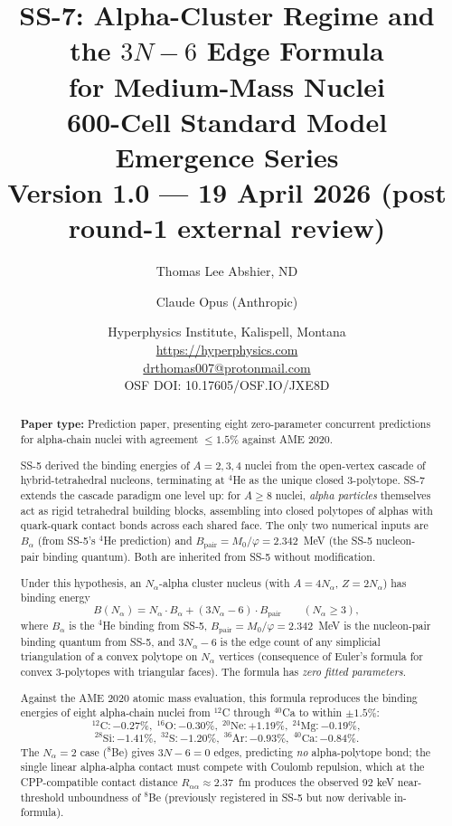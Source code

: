 \documentclass[11pt,letterpaper]{article}
\title{\textbf{SS-7: Alpha-Cluster Regime and the $3N-6$ Edge Formula\\ for Medium-Mass Nuclei}\\[6pt]
{\large 600-Cell Standard Model Emergence Series}\\[4pt]
{\normalsize Version 1.0 --- 19 April 2026 (post round-1 external review)}}
\author{Thomas Lee Abshier, ND \and Claude Opus (Anthropic)}
\date{\normalsize Hyperphysics Institute, Kalispell, Montana\\
\url{https://hyperphysics.com}\\
\href{mailto:drthomas007@protonmail.com}{drthomas007@protonmail.com}\\[4pt]
\small OSF DOI: 10.17605/OSF.IO/JXE8D}
\newcommand{\phig}{\varphi}
\newcommand{\Mzero}{M_0}
\newcommand{\Bpair}{B_{\mathrm{pair}}}
\newcommand{\Balpha}{B_{\alpha}}
\newcommand{\Nalpha}{N_{\alpha}}
\newcommand{\Raa}{R_{\alpha\alpha}}
\begin{document}
\maketitle

\begin{abstract}
\noindent\textbf{Paper type:} Prediction paper, presenting eight zero-parameter concurrent predictions for alpha-chain nuclei with agreement $\leq 1.5\%$ against AME 2020.

SS-5 derived the binding energies of $A = 2, 3, 4$ nuclei from the open-vertex cascade of hybrid-tetrahedral nucleons, terminating at ${}^4$He as the unique closed 3-polytope. SS-7 extends the cascade paradigm one level up: for $A \geq 8$ nuclei, \emph{alpha particles} themselves act as rigid tetrahedral building blocks, assembling into closed polytopes of alphas with quark-quark contact bonds across each shared face. The only two numerical inputs are $\Balpha$ (from SS-5's ${}^4$He prediction) and $\Bpair = \Mzero/\phig = 2.342$~MeV (the SS-5 nucleon-pair binding quantum). Both are inherited from SS-5 without modification.

Under this hypothesis, an $N_\alpha$-alpha cluster nucleus (with $A = 4N_\alpha$, $Z = 2N_\alpha$) has binding energy
\[
B(\Nalpha) = \Nalpha \cdot \Balpha + (3\Nalpha - 6) \cdot \Bpair \qquad (\Nalpha \geq 3),
\]
where $\Balpha$ is the $^4$He binding from SS-5, $\Bpair = \Mzero/\phig = 2.342$~MeV is the nucleon-pair binding quantum from SS-5, and $3\Nalpha - 6$ is the edge count of any simplicial triangulation of a convex polytope on $\Nalpha$ vertices (consequence of Euler's formula for convex 3-polytopes with triangular faces). The formula has \emph{zero fitted parameters}.

Against the AME 2020 atomic mass evaluation, this formula reproduces the binding energies of eight alpha-chain nuclei from ${}^{12}$C through ${}^{40}$Ca to within $\pm 1.5\%$:
\[
{}^{12}\mathrm{C}: -0.27\%, \; {}^{16}\mathrm{O}: -0.30\%, \; {}^{20}\mathrm{Ne}: +1.19\%, \; {}^{24}\mathrm{Mg}: -0.19\%,
\]
\[
{}^{28}\mathrm{Si}: -1.41\%, \; {}^{32}\mathrm{S}: -1.20\%, \; {}^{36}\mathrm{Ar}: -0.93\%, \; {}^{40}\mathrm{Ca}: -0.84\%.
\]
The $N_\alpha = 2$ case (${}^8$Be) gives $3N - 6 = 0$ edges, predicting \emph{no} alpha-polytope bond; the single linear alpha-alpha contact must compete with Coulomb repulsion, which at the CPP-compatible contact distance $\Raa \approx 2.37$~fm produces the observed 92 keV near-threshold unboundness of ${}^8$Be (previously registered in SS-5 but now derivable in-formula).


\end{abstract}
\end{document}
